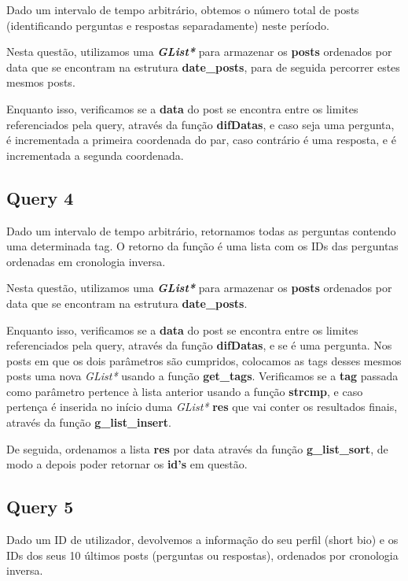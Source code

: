 \documentclass[a4paper]{article}
\begin{document}
Dado um intervalo de tempo arbitrário, obtemos o número total de posts 
(identificando perguntas e respostas separadamente) neste período.

Nesta questão, utilizamos uma \textit{\textbf{GList*}} para armazenar 
os \textbf{posts} ordenados por data que se encontram na estrutura 
\textbf{date\_posts}, para de seguida percorrer estes mesmos posts.

Enquanto isso, verificamos se a \textbf{data} do post se encontra entre 
os limites referenciados pela query, através da função \textbf{difDatas},
e caso seja uma pergunta, é incrementada a primeira coordenada do par,
caso contrário é uma resposta, e é incrementada a segunda coordenada.

\subsection{Query 4}

Dado um intervalo de tempo arbitrário, retornamos todas as perguntas 
contendo uma determinada tag. O retorno da função é uma lista com os IDs 
das perguntas ordenadas em cronologia inversa.

Nesta questão, utilizamos uma \textit{\textbf{GList*}} para armazenar 
os \textbf{posts} ordenados por data que se encontram na estrutura 
\textbf{date\_posts}.

Enquanto isso, verificamos se a \textbf{data} do post se encontra entre 
os limites referenciados pela query, através da função \textbf{difDatas},
e se é uma pergunta. Nos posts em que os dois parâmetros são cumpridos,
colocamos as tags desses mesmos posts uma nova \textit{GList*}
usando a função \textbf{get\_tags}. Verificamos se a \textbf{tag} passada 
como parâmetro pertence à lista anterior usando a função \textbf{strcmp},
e caso pertença é inserida no início duma \textit{GList*} \textbf{res} 
que vai conter os resultados finais, através da função 
\textbf{g\_list\_insert}.

De seguida, ordenamos a lista \textbf{res} por data através da função
\textbf{g\_list\_sort}, de modo a depois poder retornar os \textbf{id's}
em questão.

\subsection{Query 5}

Dado um ID de utilizador, devolvemos a informação do seu perfil (short 
bio) e os IDs dos seus 10 últimos posts (perguntas ou respostas), 
ordenados por cronologia inversa.
\end{document}
